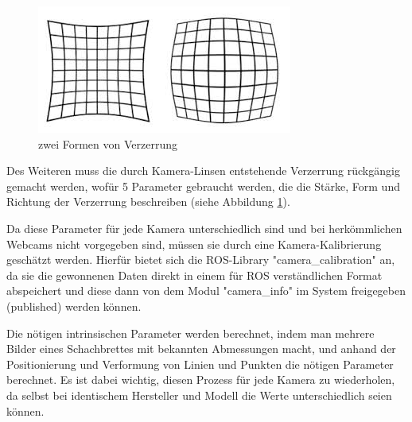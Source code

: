 \documentclass[12pt, ngerman]{article}
\begin{document}
\begin{figure}
  \includegraphics[width=\linewidth]{distortion.jpeg}
  \caption{zwei Formen von Verzerrung}
  \label{Abb: distortion}
\end{figure}
Des Weiteren muss die durch Kamera-Linsen entstehende Verzerrung rückgängig gemacht werden, wofür 5 Parameter gebraucht werden, die die Stärke, Form und Richtung der Verzerrung beschreiben (siehe Abbildung \ref{Abb: distortion}).

Da diese Parameter für jede Kamera unterschiedlich sind und bei herkömmlichen Webcams nicht vorgegeben sind, müssen sie durch eine Kamera-Kalibrierung geschätzt werden. Hierfür bietet sich die ROS-Library "camera\_calibration" an, da sie die gewonnenen Daten direkt in einem für ROS verständlichen Format abspeichert und diese dann von dem Modul "camera\_info" im System freigegeben (published) werden können.

Die nötigen intrinsischen Parameter werden berechnet, indem man mehrere Bilder eines Schachbrettes mit bekannten Abmessungen macht, und anhand der Positionierung und Verformung von Linien und Punkten die nötigen Parameter berechnet. Es ist dabei wichtig, diesen Prozess für jede Kamera zu wiederholen, da selbst bei identischem Hersteller und Modell die Werte unterschiedlich seien können.
\end{document}
